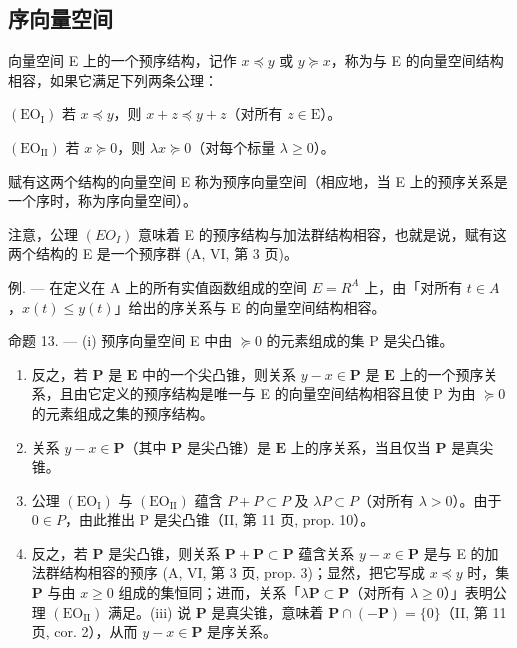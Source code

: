 \subsection{序向量空间}

向量空间 E 上的一个预序结构，记作 \(x \preccurlyeq y\) 或 \(y \succcurlyeq x\)，称为与 E 的向量空间结构相容，如果它满足下列两条公理：

\((\mathrm{EO}_{\mathrm{I}})\) 若 \(x \preccurlyeq y\)，则 \(x + z \preccurlyeq y + z\)（对所有 \(z \in \mathrm{E}\)）。

\((\mathrm{EO}_{\mathrm{II}})\) 若 \(x \succcurlyeq 0\)，则 \(\lambda x \succcurlyeq 0\)（对每个标量 \(\lambda \geqslant 0\)）。

赋有这两个结构的向量空间 E 称为预序向量空间（相应地，当 E 上的预序关系是一个序时，称为序向量空间）。

注意，公理 \((EO_{I})\) 意味着 E 的预序结构与加法群结构相容，也就是说，赋有这两个结构的 E 是一个预序群 (A, VI, 第 3 页)。

例. --- 在定义在 A 上的所有实值函数组成的空间 \(E = R^{A}\) 上，由「对所有 \(t \in A\)，\(x(t) \leqslant y(t)\)」给出的序关系与 E 的向量空间结构相容。

命题 13. --- (i) 预序向量空间 E 中由 \(\succcurlyeq 0\) 的元素组成的集 P 是尖凸锥。

\begin{enumerate}
\def\labelenumi{(\roman{enumi})}
\setcounter{enumi}{1}
\item
  反之，若 \(\mathbf{P}\) 是 \(\mathbf{E}\) 中的一个尖凸锥，则关系 \(y - x \in \mathbf{P}\) 是 \(\mathbf{E}\) 上的一个预序关系，且由它定义的预序结构是唯一与 E 的向量空间结构相容且使 P 为由 \(\succcurlyeq 0\) 的元素组成之集的预序结构。
\item
  关系 \(y - x \in \mathbf{P}\)（其中 \(\mathbf{P}\) 是尖凸锥）是 \(\mathbf{E}\) 上的序关系，当且仅当 \(\mathbf{P}\) 是真尖锥。
\item
  公理 \((\mathrm{EO}_{\mathrm{I}})\) 与 \((\mathrm{EO}_{\mathrm{II}})\) 蕴含 \(P + P \subset P\) 及 \(\lambda P \subset P\)（对所有 \(\lambda > 0\)）。由于 \(0 \in P\)，由此推出 P 是尖凸锥（II, 第 11 页, prop. 10）。
\item
  反之，若 \(\mathbf{P}\) 是尖凸锥，则关系 \(\mathbf{P} + \mathbf{P} \subset \mathbf{P}\) 蕴含关系 \(y - x \in \mathbf{P}\) 是与 E 的加法群结构相容的预序 (A, VI, 第 3 页, prop. 3)；显然，把它写成 \(x \preccurlyeq y\) 时，集 \(\mathbf{P}\) 与由 \(x \geqslant 0\) 组成的集恒同；进而，关系「\(\lambda \mathbf{P} \subset \mathbf{P}\)（对所有 \(\lambda \geqslant 0\)）」表明公理 \((\mathrm{EO}_{\mathrm{II}})\) 满足。(iii) 说 \(\mathbf{P}\) 是真尖锥，意味着 \(\mathbf{P} \cap (-\mathbf{P}) = \{0\}\)（II, 第 11 页, cor. 2），从而 \(y - x \in \mathbf{P}\) 是序关系。
\end{enumerate}

